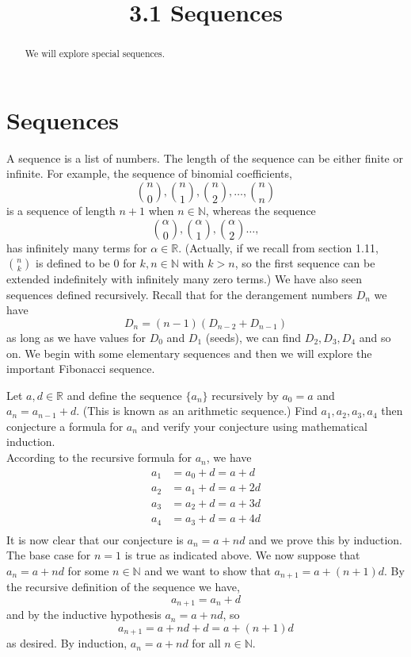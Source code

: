 \documentclass[handout]{ximera}
\title{3.1 Sequences}
\begin{document}
\begin{abstract}
We will explore special sequences.
\end{abstract}

\maketitle

\section{Sequences}
A sequence is a list of numbers. The length of the sequence can be either finite or infinite. For example,
the sequence of binomial coefficients,
\[
\binom{n}{0}, \binom{n}{1}, \binom{n}{2}, \dots, \binom{n}{n}
\]
is a sequence of length $n+1$ when $n\in \mathbb{N}$, whereas the sequence
\[
\binom{\alpha}{0}, \binom{\alpha}{1}, \binom{\alpha}{2} \dots, 
\]
has infinitely many terms for $\alpha \in \mathbb{R}$.
(Actually, if we recall from section 1.11, $\binom{n}{k}$ is defined to be $0$ for $k,n \in \mathbb{N}$ with $k > n$, 
so the first sequence can be extended indefinitely with infinitely many zero terms.)
We have also seen sequences defined recursively. Recall that for the derangement numbers $D_n$ we have
\[
D_n = (n-1)(D_{n-2} + D_{n-1})
\]
as long as we have values for $D_0$ and $D_1$ (seeds), we can find $D_2, D_3, D_4$ and so on.
We begin with some elementary sequences and then we will explore the important Fibonacci sequence.

\begin{example}[Example 1]
Let $a, d \in \mathbb{R}$ and define the sequence $\{a_n\}$ recursively by $a_0 = a$ and $a_n = a_{n-1} + d$.  (This is known as an arithmetic sequence.)
Find $a_1, a_2, a_3, a_4$ then conjecture a formula for $a_n$ and verify your conjecture using mathematical induction.\\
According to the recursive formula for $a_n$, we have
\begin{align*}
a_1 &= a_0 + d= a+d\\
a_2 &= a_1 + d= a+2d\\
a_3 &= a_2 + d= a+3d\\
a_4 &= a_3 + d= a+4d\\
\end{align*}
It is now clear that our conjecture is $a_n = a + nd$ and we prove this by induction. The base case for $n=1$ is true as indicated above.
We now suppose that $a_n = a + nd$ for some $n \in \mathbb{N}$ and we want to show that $a_{n+1} = a + (n+1)d$. 
By the recursive definition of the sequence we have,
\[
a_{n+1} = a_n + d
\]
and by the inductive hypothesis $a_n = a + nd$, so
\[
a_{n+1} = a + nd + d = a + (n+1)d
\]
as desired. By induction, $a_n = a + nd$ for all $n \in \mathbb{N}$.
\end{example}
\end{document}
